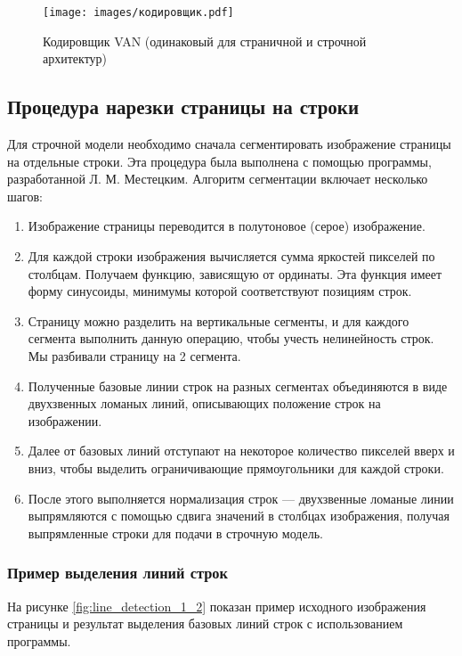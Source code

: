\documentclass{extarticle}
\begin{document}
\begin{figure}[H]
	\centering
	\texttt{[image: images/кодировщик.pdf]}
	\caption{Кодировщик VAN (одинаковый для страничной и строчной архитектур)}
	\label{fig:encoder}
\end{figure}

\subsection{Процедура нарезки страницы на строки}

Для строчной модели необходимо сначала сегментировать изображение страницы на отдельные строки. Эта процедура была выполнена с помощью программы, разработанной Л. М. Местецким. Алгоритм сегментации включает несколько шагов:

\begin{enumerate}
	\item Изображение страницы переводится в полутоновое (серое) изображение.
	\item Для каждой строки изображения вычисляется сумма яркостей пикселей по столбцам. Получаем функцию, зависящую от ординаты. Эта функция имеет форму синусоиды, минимумы которой соответствуют позициям строк.
	\item Страницу можно разделить на вертикальные сегменты, и для каждого сегмента выполнить данную операцию, чтобы учесть нелинейность строк. Мы разбивали страницу на 2 сегмента.
	\item Полученные базовые линии строк на разных сегментах объединяются в виде двухзвенных ломаных линий, описывающих положение строк на изображении.
	\item Далее от базовых линий отступают на некоторое количество пикселей вверх и вниз, чтобы выделить ограничивающие прямоугольники для каждой строки.
	\item После этого выполняется нормализация строк — двухзвенные ломаные линии выпрямляются с помощью сдвига значений в столбцах изображения, получая выпрямленные строки для подачи в строчную модель.
\end{enumerate}

\subsubsection{Пример выделения линий строк}

На рисунке \ref{fig:line_detection_1_2} показан пример исходного изображения страницы и результат выделения базовых линий строк с использованием программы.
\end{document}
